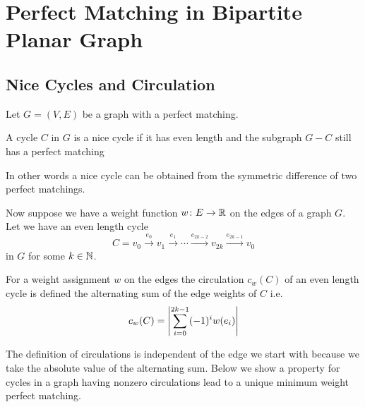 \section{Perfect Matching in Bipartite Planar Graph}
\subsection{Nice Cycles and Circulation}
Let $G=(V,E)$ be a graph with a perfect matching. 
\begin{definition}\label{nice-cycle}
    A cycle $C$ in $G$ is a nice cycle if it has even length and the subgraph $G-C$ still has a perfect matching
\end{definition}\parinf
In other words a nice cycle can be obtained from the symmetric difference of two perfect matchings.\parinn

Now suppose we have a weight function $w\colon E\to \mathbb{R}$ on the edges of a graph $G$. Let we have an even length cycle $$C=v_0\overset{e_0}{\longrightarrow}v_1\overset{e_1}{\longrightarrow}\cdots \overset{e_{2k-2}}{\longrightarrow}v_{2k}\overset{e_{2k-1}}{\longrightarrow}v_0$$ in $G$ for some $k\in \mathbb{N}$.
\begin{definition}
    For a weight assignment $w$ on the edges the circulation $c_w(C)$ of an even length cycle is defined the alternating sum of the edge weights of $C$ i.e. $$c_w(C)=\left| \sum_{i=0}^{2k-1} (-1)^i w(e_{i}) \right|$$
\end{definition}

The definition of circulations is independent of the edge we start with because we take the absolute value of the alternating sum. Below we show a property for cycles in a graph having nonzero circulations lead to a unique minimum weight perfect matching.


